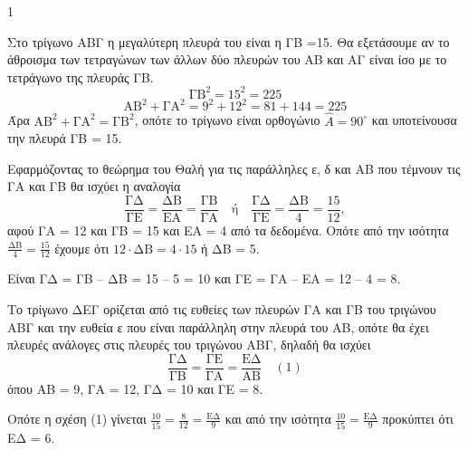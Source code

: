 \begin{ylh}{1}
    \item[ΛΥΣΗ]
\end{ylh}
\begin{alist}
    \item Στο τρίγωνο ΑΒΓ η μεγαλύτερη πλευρά του είναι η ΓΒ =15. Θα εξετάσουμε αν το άθροισμα των τετραγώνων των άλλων δύο πλευρών του ΑΒ και ΑΓ είναι ίσο με το τετράγωνο της πλευράς ΓΒ.
    \[ \text{ΓΒ}^2 = 15^2 = 225 \]
    \[ \text{ΑΒ}^2 + \text{ΓΑ}^2 = 9^2 + 12^2 = 81 + 144 = 225 \]
    Άρα $\text{ΑΒ}^2 + \text{ΓΑ}^2 = \text{ΓΒ}^2$, οπότε το τρίγωνο είναι ορθογώνιο $\hat{A}=90^\circ$ και υποτείνουσα την πλευρά ΓΒ = 15.

    \item 
    \begin{rlist}
        \item Εφαρμόζοντας το θεώρημα του Θαλή για τις παράλληλες ε, δ και ΑΒ που τέμνουν τις ΓΑ και ΓΒ θα ισχύει η αναλογία
        \[ \frac{\text{ΓΔ}}{\text{ΓΕ}} = \frac{\text{ΔΒ}}{\text{ΕΑ}} = \frac{\text{ΓΒ}}{\text{ΓΑ}} \quad \text{ή} \quad \frac{\text{ΓΔ}}{\text{ΓΕ}} = \frac{\text{ΔΒ}}{4} = \frac{15}{12}, \]
        αφού ΓΑ = 12 και ΓΒ = 15 και ΕΑ = 4 από τα δεδομένα. Οπότε από την ισότητα $\frac{\text{ΔΒ}}{4} = \frac{15}{12}$ έχουμε ότι $12 \cdot \text{ΔΒ} = 4 \cdot 15$ ή ΔΒ = 5.

        \item Είναι ΓΔ = ΓΒ – ΔΒ = 15 – 5 = 10 και ΓΕ = ΓΑ – ΕΑ = 12 – 4 = 8.

        Το τρίγωνο ΔΕΓ ορίζεται από τις ευθείες των πλευρών ΓΑ και ΓΒ του τριγώνου ΑΒΓ και την ευθεία ε που είναι παράλληλη στην πλευρά του ΑΒ, οπότε θα έχει πλευρές ανάλογες στις πλευρές του τριγώνου ΑΒΓ, δηλαδή θα ισχύει
        \[ \frac{\text{ΓΔ}}{\text{ΓΒ}} = \frac{\text{ΓΕ}}{\text{ΓΑ}} = \frac{\text{ΕΔ}}{\text{ΑΒ}} \quad (1) \]
        όπου ΑΒ = 9, ΓΑ = 12, ΓΔ = 10 και ΓΕ = 8.
        
        Οπότε η σχέση (1) γίνεται $\frac{10}{15} = \frac{8}{12} = \frac{\text{ΕΔ}}{9}$ και από την ισότητα $\frac{10}{15} = \frac{\text{ΕΔ}}{9}$ προκύπτει ότι ΕΔ = 6.
    \end{rlist}
\end{alist}